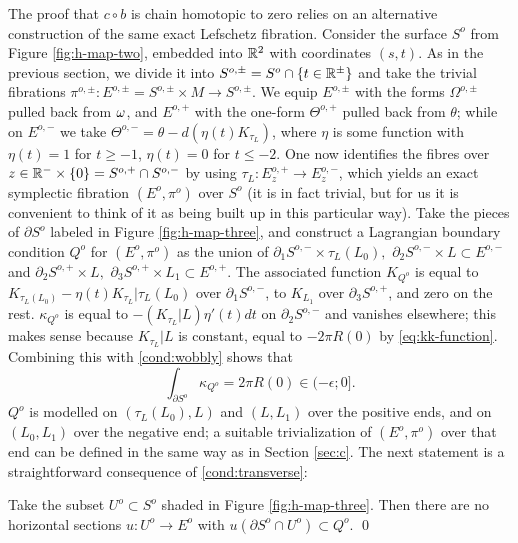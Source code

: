 \documentclass[10pt,letterpaper]{article}
\begin{document}
%
The proof that $c \circ b$ is chain homotopic to zero relies on an alternative
construction of the same exact Lefschetz fibration. Consider the surface $S^o$
from Figure \ref{fig:h-map-two}, embedded into $\mathbb{R}^2$ with coordinates $(s,t)$.
As in the previous section, we divide it into $S^{o,\pm} = S^o \cap \{t \in
\mathbb{R}^{\pm}\}$ and take the trivial fibrations $\pi^{o,\pm}: E^{o,\pm} = S^{o,\pm}
\times M \rightarrow S^{o,\pm}$. We equip $E^{o,\pm}$ with the forms
$\Omega^{o,\pm}$ pulled back from $\omega$, and $E^{o,+}$ with the one-form
$\Theta^{o,+}$ pulled back from $\theta$; while on $E^{o,-}$ we take
$\Theta^{o,-} = \theta - d(\eta(t)K_{\tau_L})$, where $\eta$ is some function
with $\eta(t) = 1$ for $t \geq -1$, $\eta(t) = 0$ for $t \leq -2$. One now
identifies the fibres over $z \in \mathbb{R}^- \times \{0\} = S^{o,+} \cap S^{o,-}$ by
using $\tau_L: E^{o,+}_z \rightarrow E^{o,-}_z$, which yields an exact
symplectic fibration $(E^o,\pi^o)$ over $S^o$ (it is in fact trivial, but for
us it is convenient to think of it as being built up in this particular way).
Take the pieces of $\partial S^o$ labeled in Figure \ref{fig:h-map-three}, and
construct a Lagrangian boundary condition $Q^o$ for $(E^o,\pi^o)$ as the union
of $\partial_1S^{o,-} \times \tau_L(L_0), \,\, \partial_2S^{o,-} \times L
\subset E^{o,-}$ and $\partial_2S^{o,+} \times L, \,\, \partial_3S^{o,+} \times
L_1 \subset E^{o,+}$. The associated function $K_{Q^o}$ is equal to
$K_{\tau_L(L_0)} - \eta(t)K_{\tau_L}|\tau_L(L_0)$ over $\partial_1S^{o,-}$, to
$K_{L_1}$ over $\partial_3S^{o,+}$, and zero on the rest. $\kappa_{Q^o}$ is
equal to $-(K_{\tau_L}|L) \eta'(t) dt$ on $\partial_2S^{o,-}$ and vanishes
elsewhere; this makes sense because $K_{\tau_L}|L$ is constant, equal to $-2\pi
R(0)$ by \eqref{eq:kk-function}. Combining this with \ref{cond:wobbly} shows
that
\begin{equation} \label{eq:kappao}
\int_{\partial S^o} \kappa_{Q^o} = 2\pi R(0) \in (-\epsilon;0].
\end{equation}
$Q^o$ is modelled on $(\tau_L(L_0),L)$ and $(L,L_1)$ over the positive ends,
and on $(L_0,L_1)$ over the negative end; a suitable trivialization of
$(E^o,\pi^o)$ over that end can be defined in the same way as in Section
\ref{sec:c}. The next statement is a straightforward consequence of
\ref{cond:transverse}:

\begin{lemma} \label{th:o-sections}
Take the subset $U^o \subset S^o$ shaded in Figure \ref{fig:h-map-three}. Then
there are no horizontal sections $u: U^o \rightarrow E^o$ with $u(\partial S^o
\cap U^o) \subset Q^o$. \qed
\end{lemma}
\end{document}
